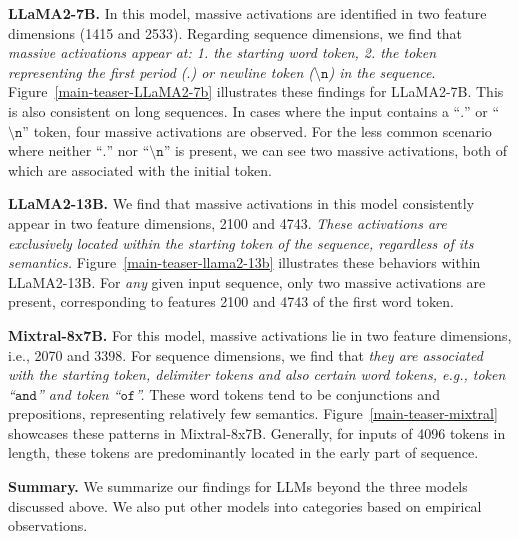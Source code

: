 \documentclass[10pt]{article}
\theoremstyle{definition}
\theoremstyle{plain}
\begin{document}
\textbf{LLaMA2-7B.} In this model, massive activations are identified in two feature dimensions (1415 and 2533). Regarding sequence dimensions, we find that \textit{massive activations appear at: 1. the starting word token, 2. the token representing the first period ($\texttt{.}$) or newline token ($\texttt{\textbackslash n}$) in the sequence}. Figure~\ref{main-teaser-LLaMA2-7b} illustrates these findings for LLaMA2-7B. This is also consistent on long sequences. In cases where the input contains a ``$\texttt{.}$'' or ``$\texttt{\textbackslash n}$'' token, four massive activations are observed. For the less common scenario where neither ``$\texttt{.}$'' nor ``$\texttt{\textbackslash n}$'' is present, we can see two massive activations, both of which are associated with the initial token. 


\textbf{LLaMA2-13B.} We find that massive activations in this model consistently appear in two feature dimensions, 2100 and 4743. \textit{These activations are exclusively located within the starting token of the sequence, regardless of its semantics.} Figure~\ref{main-teaser-llama2-13b} illustrates these behaviors within LLaMA2-13B. For \textit{any} given input sequence, only two massive activations are present, corresponding to features 2100 and 4743 of the first word token.

\textbf{Mixtral-8x7B.} For this model, massive activations lie in two feature dimensions, i.e., 2070 and 3398. For sequence dimensions, we find that \textit{they are associated with the starting token, delimiter tokens and also certain word tokens, e.g., token ``$\texttt{and}$'' and token ``$\texttt{of}$''.}  These word tokens tend to be conjunctions and prepositions, representing relatively few semantics. Figure~\ref{main-teaser-mixtral} showcases these patterns in Mixtral-8x7B. Generally, for inputs of 4096 tokens in length, these tokens are predominantly located in the early part of sequence.


\textbf{Summary.} We summarize our findings for LLMs beyond the three models discussed above. We also put other models into categories based on empirical observations.
\end{document}
